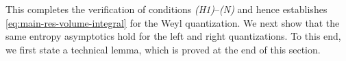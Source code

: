 \documentclass[a4paper,12pt]{article}
\let\originalleft\left
\let\originalright\right
\renewcommand{\left}{\mathopen{}\mathclose\bgroup\originalleft}
\renewcommand{\right}{\aftergroup\egroup\originalright}
\newcommand{\N}{\mathbb{N}}
\newcommand{\R}{\mathbb{R}}
\newcommand{\diff}{\mathop{}\!d}
\newcommand{\symbolnot}{\sigma}
\begin{document}




\color{black}




This completes the verification of conditions \emph{(H1)}–\emph{(N)} and hence
establishes \eqref{eq:main-res-volume-integral} for the Weyl quantization.
We next show that the same entropy asymptotics hold for the left and right
quantizations.
To this end, we first state a technical lemma, which is proved at the end of this
section.
\end{document}
